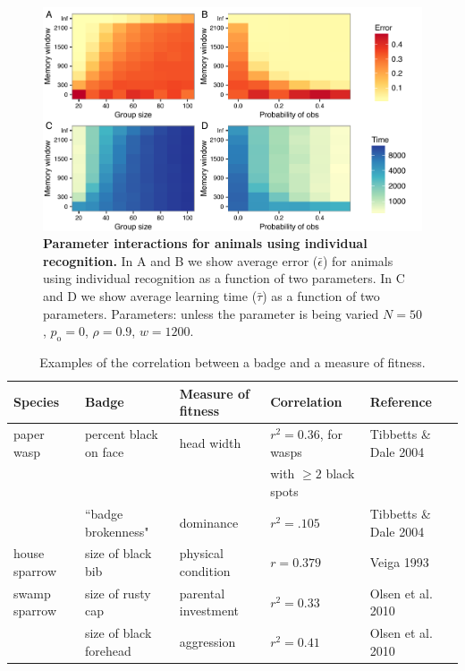 \begin{figure}[ht]
\includegraphics[width=.8\textwidth]{figures/parameter_interactions_indiv.pdf}
\caption{\sffamily\small\textbf{Parameter interactions for animals using individual recognition.}
In A and B we show average error ($\bar{\epsilon}$) for animals using individual recognition as a function of two parameters. In C and D we show average learning time ($\bar{\tau}$) as a function of two parameters. Parameters: unless the parameter is being varied $N=50$, $p_\text{o}=0$, $\rho=0.9$, $w=1200$.}
\label{interactions_indiv}
\end{figure}

\begin{table}
\caption{\label{corr_examples} Examples of the correlation between a badge and a measure of fitness.}
\begin{tabular}{lllll}
Species & Badge & Measure of fitness & Correlation & Reference
\\\hline paper wasp & percent black on face & head width & $r^2=0.36$, for wasps  & Tibbetts \& Dale 2004
\\ & & & with $\geq 2$ black spots
\\ & ``badge brokenness" & dominance & $r^2=.105$ & Tibbetts \& Dale 2004
\\ \hline house sparrow & size of black bib & physical condition & $r=0.379$ & Veiga 1993
\\ \hline swamp sparrow & size of rusty cap & parental investment & $r^2=0.33$ & Olsen et al. 2010
\\ & size of black forehead & aggression & $r^2=0.41$ & Olsen et al. 2010
\end{tabular}
\end{table}


